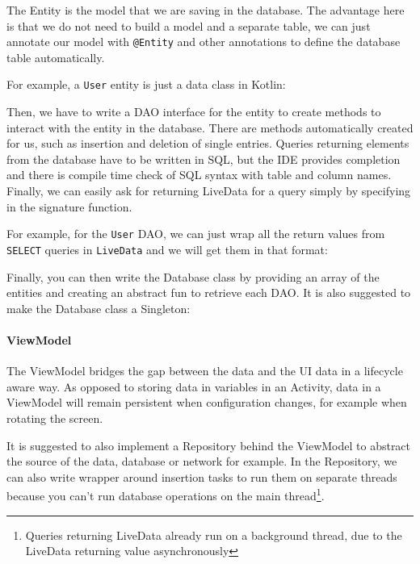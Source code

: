 \documentclass[11pt,a4paper]{report}
\begin{document}
The Entity\cite{android:training:jetpack:room:entities} is the model that we are saving in the database. The advantage here is that we do not need to build a model and a separate table, we can just annotate our model with \texttt{@Entity} and other annotations to define the database table automatically.

For example, a \verb+User+ entity is just a data class in Kotlin:

Then, we have to write a DAO\cite{android:training:jetpack:room:dao} interface for the entity to create methods to interact with the entity in the database. There are methods automatically created for us, such as insertion and deletion of single entries. Queries returning elements from the database have to be written in SQL, but the IDE provides completion and there is compile time check of SQL syntax with table and column names. Finally, we can easily ask for returning LiveData for a query simply by specifying in the signature function.

For example, for the \verb+User+ DAO, we can just wrap all the return values from \verb+SELECT+ queries in \verb+LiveData+ and we will get them in that format:

Finally, you can then write the Database\cite{android:training:jetpack:room:db} class by providing an array of the entities and creating an abstract fun to retrieve each DAO. It is also suggested to make the Database class a Singleton\cite{android:training:jetpack:room}:

\paragraph{ViewModel}
The ViewModel\cite{android:doc:viewmodel} bridges the gap between the data and the UI data in a lifecycle aware way. As opposed to storing data in variables in an Activity, data in a ViewModel will remain persistent when configuration changes, for example when rotating the screen.

It is suggested to also implement a Repository behind the ViewModel to abstract the source of the data, database or network for example. In the Repository, we can also write wrapper around insertion tasks to run them on separate threads because you can't run database operations on the main thread\footnote{Queries returning LiveData already run on a background thread, due to the LiveData returning value asynchronously}.
\end{document}
